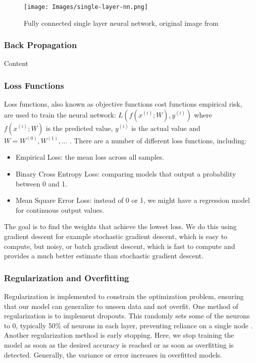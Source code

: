 \begin{figure}[H]
\begin{center}
    \texttt{[image: Images/single-layer-nn.png]}
    \caption{Fully connected single layer neural network, original image from \cite{methods-for-ds-slides}}
    \label{fig:nn-architecture}
\end{center}
\end{figure}

\subsubsection{Back Propagation}

Content

\subsubsection{Loss Functions}

Loss functions, also known as objective functions cost functions empirical risk, are used to train the neural network: $L(f(x^{(i)};W), y^{(i)})$ where $f(x^{(i)};W)$ is the predicted value, $y^{(i)}$ is the actual value and $W = {W^{(0)}, W^{(1)}, ...}$ \cite{methods-for-ds-slides}. There are a number of different loss functions, including:

\begin{itemize}
    \item Empirical Loss: the mean loss across all samples.
    \item Binary Cross Entropy Loss: comparing models that output a probability between 0 and 1.
    \item Mean Square Error Loss: instead of 0 or 1, we might have a regression model for continuous output values.
\end{itemize}

The goal is to find the weights that achieve the lowest loss. We do this using gradient descent for example stochastic gradient descent, which is easy to compute, but noisy, or batch gradient descent, which is fast to compute and provides a much better estimate than stochastic gradient descent. 

\subsubsection{Regularization and Overfitting}

Regularization is implemented to constrain the optimization problem, ensuring that our model can generalize to unseen data and not overfit. One method of regularization is to implement dropouts. This randomly sets some of the neurons to 0, typically 50\% of neurons in each layer, preventing reliance on a single node \cite{methods-for-ds-slides}. Another regularization method is early stopping. Here, we stop training the model as soon as the desired accuracy is reached or as soon as overfitting is detected. Generally, the variance or error increases in overfitted models. 

